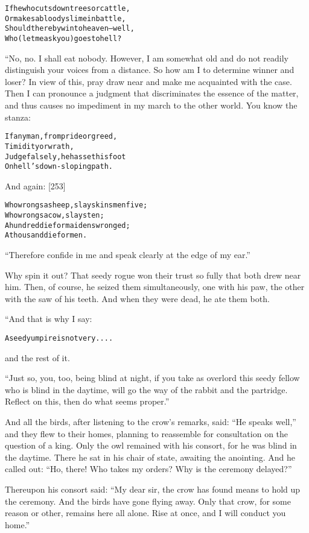 \documentclass{article}
\renewenvironment{verbatim}{\begin{alltt}\normalfont\begin{centering}}{\end{centering}\end{alltt}}
\begin{document}
\begin{verbatim}
If he who cuts down trees or cattle,
Or makes a bloody slime in battle,
Should thereby win to heaven--well,
Who (let me ask you) goes to hell?
\end{verbatim}
“No, no. I shall eat nobody. However, I am somewhat old and do not
readily distinguish your voices from a distance. So how am I to
determine winner and loser? In view of this, pray draw near and
make me acquainted with the case. Then I can pronounce a judgment
that discriminates the essence of the matter, and thus causes no
impediment in my march to the other world. You know the stanza:

\begin{verbatim}
If any man, from pride or greed,
    Timidity or wrath,
Judge falsely, he has set his foot
    On hell's down-sloping path.
\end{verbatim}
And again: [253]

\begin{verbatim}
Who wrongs a sheep, slays kinsmen five;
    Who wrongs a cow, slays ten;
A hundred die for maidens wronged;
    A thousand die for men.
\end{verbatim}
``Therefore confide in me and speak clearly at the edge of my ear.''

Why spin it out? That seedy rogue won their trust so fully that
both drew near him. Then, of course, he seized them simultaneously,
one with his paw, the other with the saw of his teeth. And when
they were dead, he ate them both.

“And that is why I say:

\begin{verbatim}
A seedy umpire is not very. . . .
\end{verbatim}
and the rest of it.

``Just so, you, too, being blind at night, if you take as overlord this seedy fellow who is blind in the daytime, will go the way of the rabbit and the partridge. Reflect on this, then do what seems proper.''

And all the birds, after listening to the crow's remarks, said:
``He speaks well,'' and they flew to their homes, planning to
reassemble for consultation on the question of a king. Only the owl
remained with his consort, for he was blind in the daytime. There
he sat in his chair of state, awaiting the anointing. And he called
out:
``Ho, there! Who takes my orders? Why is the ceremony delayed?''

Thereupon his consort said:
``My dear sir, the crow has found means to hold up the ceremony. And the birds have gone flying away. Only that crow, for some reason or other, remains here all alone. Rise at once, and I will conduct you home.''
\end{document}
